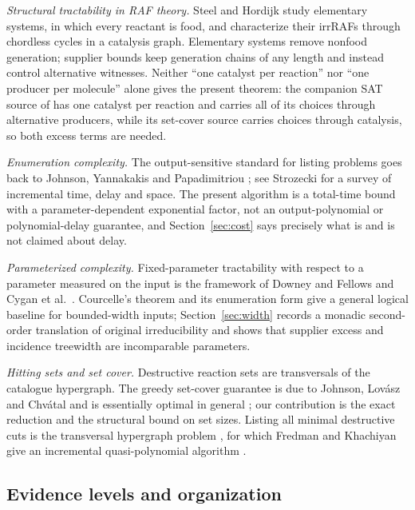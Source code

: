 \documentclass[11pt,a4paper]{article}
\theoremstyle{plain}
\theoremstyle{definition}
\theoremstyle{remark}
\begin{document}
\emph{Structural tractability in RAF theory.} Steel and Hordijk \cite{steel2018tractable} study elementary systems, in which every reactant is food, and characterize their irrRAFs through chordless cycles in a catalysis graph. Elementary systems remove nonfood generation; supplier bounds keep generation chains of any length and instead control alternative witnesses. Neither ``one catalyst per reaction'' nor ``one producer per molecule'' alone gives the present theorem: the companion SAT source of \cite{classification2026} has one catalyst per reaction and carries all of its choices through alternative producers, while its set-cover source carries choices through catalysis, so both excess terms are needed.

\emph{Enumeration complexity.} The output-sensitive standard for listing problems goes back to Johnson, Yannakakis and Papadimitriou \cite{johnson1988generating}; see Strozecki \cite{strozecki2023enumeration} for a survey of incremental time, delay and space. The present algorithm is a total-time bound with a parameter-dependent exponential factor, not an output-polynomial or polynomial-delay guarantee, and Section~\ref{sec:cost} says precisely what is and is not claimed about delay.

\emph{Parameterized complexity.} Fixed-parameter tractability with respect to a parameter measured on the input is the framework of Downey and Fellows \cite{downey2013fundamentals} and Cygan et al.\ \cite{cygan2015parameterized}. Courcelle's theorem \cite{courcelle1990monadic} and its enumeration form \cite{courcelle2009linear} give a general logical baseline for bounded-width inputs; Section~\ref{sec:width} records a monadic second-order translation of original irreducibility and shows that supplier excess and incidence treewidth are incomparable parameters.

\emph{Hitting sets and set cover.} Destructive reaction sets are transversals of the catalogue hypergraph. The greedy set-cover guarantee is due to Johnson, Lov\'asz and Chv\'atal \cite{johnson1974approximation,lovasz1975ratio,chvatal1979greedy} and is essentially optimal in general \cite{feige1998threshold,dinur2014analytical}; our contribution is the exact reduction and the structural bound on set sizes. Listing all minimal destructive cuts is the transversal hypergraph problem \cite{eiter1995identifying}, for which Fredman and Khachiyan give an incremental quasi-polynomial algorithm \cite{fredman1996complexity}.

\subsection{Evidence levels and organization}
\end{document}
